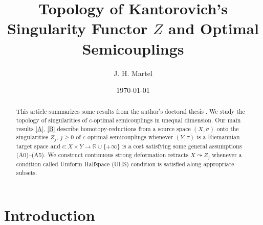 \documentclass[12pt]{amsart}
\theoremstyle{definition}
\theoremstyle{remark}
\newcommand{\bR}{\mathbb{R}}
\begin{document}
\title{Topology of Kantorovich's Singularity Functor $Z$ and Optimal Semicouplings}


\author{J. H. Martel}
\date{\today}
\maketitle

\begin{abstract}
This article summarizes some results from the author's doctoral thesis \cite{martel}. We study the topology of singularities of $c$-optimal semicouplings in unequal dimension. Our main results \ref{A}, \ref{B} describe homotopy-reductions from a source space $(X,\sigma)$ onto the singularities $Z_j$, $j\geq 0$ of $c$-optimal semicouplings whenever $(Y, \tau)$ is a Riemannian target space and $c: X\times Y\to \bR \cup \{+\infty\}$ is a cost satisfying some general assumptions (A0)--(A5). We construct continuous strong deformation retracts $X\leadsto Z_j$ whenever a condition called Uniform Halfspace (UHS) condition is satisfied along appropriate subsets. 


\end{abstract}
\tableofcontents






\section{Introduction}

\end{document}
